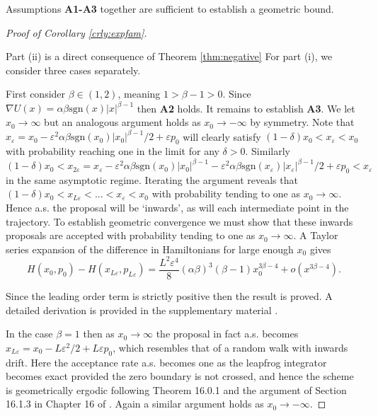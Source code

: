 \documentclass[bj,numbers,noshowframe]{imsart}
\theoremstyle{definition}
\theoremstyle{plain}
\theoremstyle{definition}
\begin{document}
\vspace{0.35cm}

\noindent Assumptions \textbf{A1-A3} together are sufficient to establish a geometric bound.

\begin{proof}[Proof of Corollary \ref{crly:expfam}] \label{proof:expfam}

Part (ii) is a direct consequence of Theorem \ref{thm:negative} For part (i), we
consider three cases separately. 

First consider $\beta\in(1,2)$, meaning $1>\beta-1>0$. Since $\nabla U(x)=\alpha\beta\text{sgn}(x)|x|^{\beta-1}$
then \textbf{A2} holds. It remains to establish \textbf{A3}. We let
$x_{0}\to\infty$ but an analogous argument holds as $x_{0}\to-\infty$
by symmetry. Note that $x_{\varepsilon}=x_{0}-\varepsilon^{2}\alpha\beta\text{sgn}(x_{0})|x_{0}|^{\beta-1}/2+\varepsilon p_{0}$
will clearly satisfy $(1-\delta)x_{0}<x_{\varepsilon}<x_{0}$ with
probability reaching one in the limit for any $\delta>0$. Similarly
$(1-\delta)x_{0}<x_{2\varepsilon}=x_{\varepsilon}-\varepsilon^{2}\alpha\beta\text{sgn}(x_{0})|x_{0}|^{\beta-1}-\varepsilon^{2}\alpha\beta\text{sgn}(x_{\varepsilon})|x_{\varepsilon}|^{\beta-1}/2+\varepsilon p_{0}<x_{\varepsilon}$
in the same asymptotic regime. Iterating the argument reveals that
$(1-\delta)x_{0}<x_{L\varepsilon}<...<x_{\varepsilon}<x_{0}$ with
probability tending to one as $x_{0}\to\infty$. Hence a.s. the proposal
will be `inwards', as will each intermediate point in the trajectory.
To establish geometric convergence we must show that these inwards
proposals are accepted with probability tending to one as $x_{0}\to\infty$.
A Taylor series expansion of the difference in Hamiltonians for large enough $x_{0}$
gives
\[
H(x_{0},p_{0})-H(x_{L\varepsilon},p_{L\varepsilon})=\frac{L^{2}\varepsilon^{4}}{8}(\alpha\beta)^{3}(\beta-1)x_{0}^{3\beta-4}+o(x^{3\beta-4}).
\]

Since the leading order term is strictly positive then the result
is proved. A detailed derivation is provided in the supplementary
material \citep{supplement}.

In the case $\beta=1$ then as $x_{0}\to\infty$ the proposal in fact
a.s. becomes $x_{L\varepsilon}=x_{0}-L\varepsilon^{2}/2+L\varepsilon p_{0}$,
which resembles that of a random walk with inwards drift. Here the
acceptance rate a.s. becomes one as the leapfrog integrator becomes
exact provided the zero boundary is not crossed, and hence the scheme
is geometrically ergodic following Theorem 16.0.1 and the argument
of Section 16.1.3 in Chapter 16 of \cite{meyn2012markov}. Again
a similar argument holds as $x_{0}\to-\infty$.


\end{proof}
\end{document}
